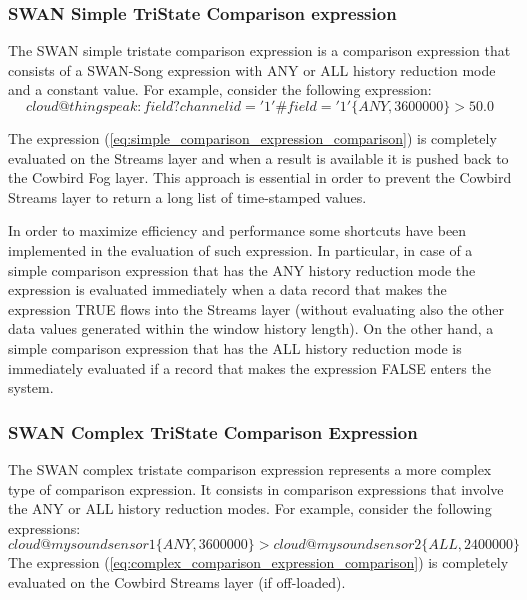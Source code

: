 \subsubsection{SWAN Simple TriState Comparison expression} 
The SWAN simple tristate comparison expression is a comparison expression that consists of a SWAN-Song expression with ANY or ALL history reduction mode and a constant value. For example, consider the following expression:
\begin{equation}\label{eq:simple_comparison_expression_comparison}
cloud@thingspeak:field?channelid='1'\#field='1'\big\{ANY,3600000\big\} > 50.0
\end{equation}

The expression (\ref{eq:simple_comparison_expression_comparison}) is completely evaluated on the Streams layer and when a result is available it is pushed back to the Cowbird Fog layer. This approach is essential in order to prevent the Cowbird Streams layer to return a long list of time-stamped values. 

In order to maximize efficiency and performance some shortcuts have been implemented in the evaluation of such expression. In particular, in case of a simple comparison expression that has the ANY history reduction mode the expression is evaluated immediately when a data record that makes the expression TRUE flows into the Streams layer (without evaluating also the other data values generated within the window history length). On the other hand, a simple comparison expression that has the ALL history reduction mode is immediately evaluated if a record that makes the expression FALSE enters the system.


\subsubsection{SWAN Complex TriState Comparison Expression} 
The SWAN complex tristate comparison expression represents a more complex type of comparison expression. It consists in comparison expressions that involve the ANY or ALL history reduction modes. For example, consider the following expressions:
\begin{equation}\label{eq:complex_comparison_expression_comparison}
cloud@mysoundsensor1\big\{ANY, 3600000\big\} > cloud@mysoundsensor2\big\{ALL, 2400000\big\} 
\end{equation}
The expression (\ref{eq:complex_comparison_expression_comparison}) is completely evaluated on the Cowbird Streams layer (if off-loaded).

